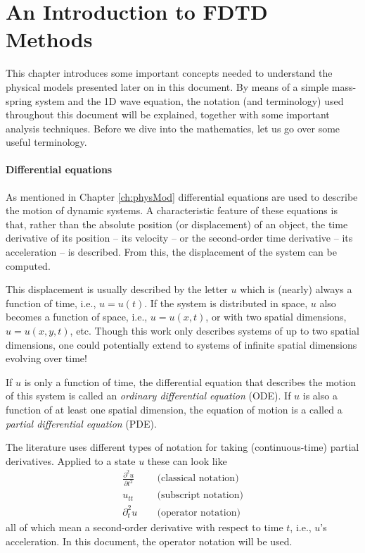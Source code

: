 \chapter{An Introduction to FDTD Methods}
This chapter introduces some important concepts needed to understand the physical models presented later on in this document. 
By means of a simple mass-spring system and the 1D wave equation, the notation (and terminology) used throughout this document will be explained, together with some important analysis techniques. 
Before we dive into the mathematics, let us go over some useful terminology.

\subsubsection{Differential equations}
As mentioned in Chapter \ref{ch:physMod} differential equations are used to describe the motion of dynamic systems. A characteristic feature of these equations is that, rather than the absolute position (or displacement) of an object, the time derivative of its position -- its velocity -- or the second-order time derivative -- its acceleration -- is described. From this, the displacement of the system can be computed.

This displacement is usually described by the letter $u$ which is (nearly) always a function of time, i.e., $u=u(t)$. If the system is distributed in space, $u$ also becomes a function of space, i.e., $u = u(x,t)$, or with two spatial dimensions, $u = u(x,y,t)$, etc. Though this work only describes systems of up to two spatial dimensions, one could potentially extend to systems of infinite spatial dimensions evolving over time! 

If $u$ is only a function of time, the differential equation that describes the motion of this system is called an \textit{ordinary differential equation} (ODE). If $u$ is also a function of at least one spatial dimension, the equation of motion is a called a \textit{partial differential equation} (PDE).

The literature uses different types of notation for taking (continuous-time) partial derivatives. Applied to a state $u$ these can look like 
%
\begin{equation}\nonumber
    \begin{aligned}
        \frac{\partial^2 u}{\partial t^2} & \quad \text{(classical notation)}\\
        u_{tt}\:\,& \quad \text{(subscript notation)}\\[3pt]
        \partial^2_t u\: & \quad \text{(operator notation)}
    \end{aligned}
\end{equation}
%
all of which mean a second-order derivative with respect to time $t$, i.e., $u$'s acceleration. In this document, the operator notation will be used.

